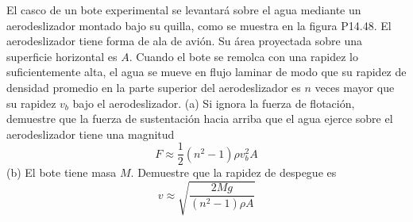 \item El casco de un bote experimental se levantará sobre el agua mediante un aerodeslizador montado bajo su quilla, como se muestra en la figura P14.48. El aerodeslizador tiene forma de ala de avión. Su área proyectada sobre una superficie horizontal es $A$. Cuando el bote se remolca con una rapidez lo suficientemente alta, el agua se mueve en flujo laminar de modo que su rapidez de densidad promedio en la parte superior del aerodeslizador es $n$ veces mayor que su rapidez $v_b$ bajo el aerodeslizador. (a) Si ignora la fuerza de flotación, demuestre que la fuerza de sustentación hacia arriba que el agua ejerce sobre el aerodeslizador tiene una magnitud
$$ F \approx \frac{1}{2} (n^2 - 1) \rho v_b^2 A $$
(b) El bote tiene masa $M$. Demuestre que la rapidez de despegue es
$$ v \approx \sqrt{\frac{2Mg}{(n^2 - 1) \rho A}} $$
